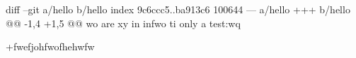 diff --git a/hello b/hello
index 9c6ccc5..ba913c6 100644
--- a/hello
+++ b/hello
@@ -1,4 +1,5 @@
 wo are xy in infwo ti only a test:wq
 
+fwefjohfwofhehwfw
 
 
